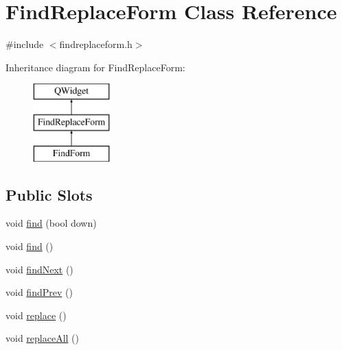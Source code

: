\hypertarget{class_find_replace_form}{}\section{Find\+Replace\+Form Class Reference}
\label{class_find_replace_form}


{\ttfamily \#include $<$findreplaceform.\+h$>$}

Inheritance diagram for Find\+Replace\+Form\+:\begin{figure}[H]
\begin{center}
\leavevmode
\includegraphics[height=3.000000cm]{class_find_replace_form}
\end{center}
\end{figure}
\subsection*{Public Slots}
\begin{DoxyCompactItemize}
\item 
void \hyperlink{class_find_replace_form_af049cb8244954e17c792dc960ce544a0}{find} (bool down)
\item 
void \hyperlink{class_find_replace_form_ad2f83207e2b70f30680049286033915b}{find} ()
\item 
void \hyperlink{class_find_replace_form_a4aa85cfca1753dd04c1a118ac17257d9}{find\+Next} ()
\item 
void \hyperlink{class_find_replace_form_a98ff3bc6e591f268bb44ce02c5e70663}{find\+Prev} ()
\item 
void \hyperlink{class_find_replace_form_abe7bcb37012970be0e5bc6e7016cb0a3}{replace} ()
\item 
void \hyperlink{class_find_replace_form_aec41613e2aaac883f638d032d4d90d55}{replace\+All} ()
\end{DoxyCompactItemize}
